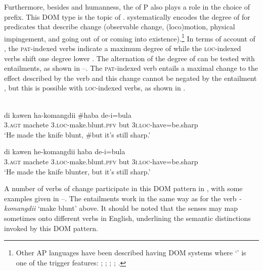 \documentclass[output=paper]{LSP/langsci}
\begin{document}
Furthermore, besides  and humanness, the  of P also plays a role in the choice of prefix. This DOM type is the topic of \citet{Kratochviletal2015Degrees}.  systematically encodes the degree of  for predicates that describe change (observable change, (loco)motion, physical impingement, and going out of or coming into existence).\footnote{Other AP languages have been described having DOM systems where  ‘’ is one of the trigger features:   \citep[188--189]{Steinhauer2014Blagar};  \citep[64--66]{Feddenetal2014Variation};   \citep{Baird2008Grammar};  \citep{Kratochvil2014Sawila};  \citep{Williams2016Kula}.} In terms of  account of , the  \textsc{pat}-indexed verbs indicate a maximum degree of  while the \textsc{loc}-indexed verbs shift one degree lower \citep[232]{Kratochviletal2015Degrees}. The alternation of the degree of  can be tested with entailments, as shown in --. The \textsc{pat}-indexed verb entails a maximal change to the effect described by the verb and this change cannot be negated by the entailment , but this is possible with \textsc{loc}-indexed verbs, as shown in .

\ea\label{03-kl-ex:27-28}
\\
	\ea\label{03-kl-ex:27}
	\gll di	kawen	ha-komangdii	\#haba	de-i=bula	\\ 
		 	3.\textsc{agt}	machete	3.\textsc{loc}-make.blunt.\textsc{pfv}	but	3\textsc{i.loc}-have=be.sharp\\ 
		\glt `He made the knife blunt, \#but it’s still sharp.'

	\ex\label{03-kl-ex:28}
	\gll di	kawen	he-komangdii	haba		de-i=bula\\ 
	\textsc{3.agt}	machete	\textsc{3.loc}-make.blunt.\textsc{pfv}	but	\textsc{3i.loc}-have=be.sharp\\
	\glt `He made the knife blunter, but it’s still sharp.'
	\z
\z

A number of verbs of change participate in this DOM pattern in , with some examples given in --. The entailments work in the same way as for the verb \mbox{\textit{-komangdii}} ‘make blunt’ above. It should be noted that the  senses may map sometimes onto different verbs in English, underlining the semantic distinctions invoked by this DOM pattern.
\end{document}

